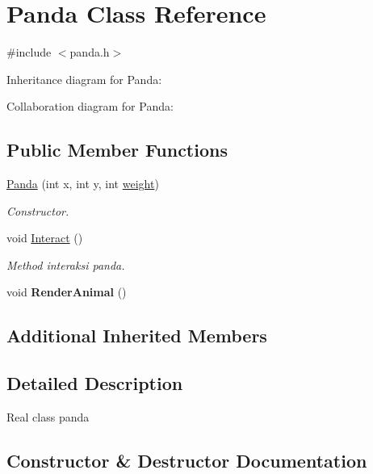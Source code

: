 \hypertarget{classPanda}{}\section{Panda Class Reference}
\label{classPanda}


{\ttfamily \#include $<$panda.\+h$>$}



Inheritance diagram for Panda\+:


Collaboration diagram for Panda\+:
\subsection*{Public Member Functions}
\begin{DoxyCompactItemize}
\item 
\hyperlink{classPanda_ae786524350b4d45219f7bdf444239875}{Panda} (int x, int y, int \hyperlink{classAnimal_a9a3b22f243f7109c57f36b3c660feb6e}{weight})
\begin{DoxyCompactList}\small\item\em Constructor. \end{DoxyCompactList}\item 
void \hyperlink{classPanda_a1f372761ecb6373a0a9be6645063071c}{Interact} ()\hypertarget{classPanda_a1f372761ecb6373a0a9be6645063071c}{}\label{classPanda_a1f372761ecb6373a0a9be6645063071c}

\begin{DoxyCompactList}\small\item\em Method interaksi panda. \end{DoxyCompactList}\item 
void {\bfseries Render\+Animal} ()\hypertarget{classPanda_aee053b9579623833d43be089780a0c3c}{}\label{classPanda_aee053b9579623833d43be089780a0c3c}

\end{DoxyCompactItemize}
\subsection*{Additional Inherited Members}


\subsection{Detailed Description}
Real class panda 

\subsection{Constructor \& Destructor Documentation}
